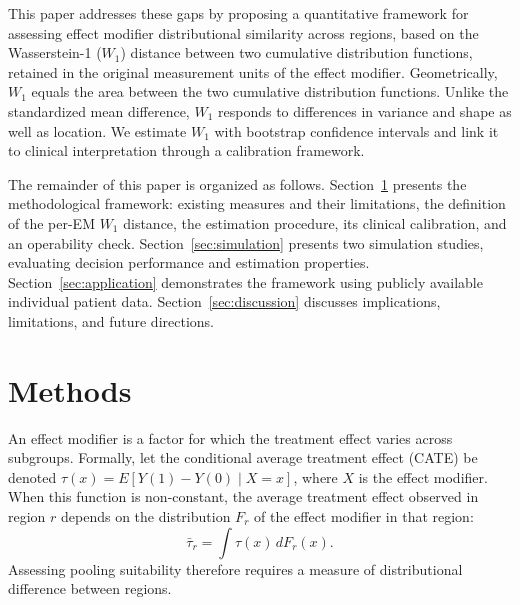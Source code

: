 \documentclass[AMA,Times1COL]{WileyNJDv5}
\begin{document}
This paper addresses these gaps by proposing a quantitative framework for assessing effect modifier distributional similarity across regions, based on the Wasserstein-1 ($W_1$) distance between two cumulative distribution functions, retained in the original measurement units of the effect modifier. Geometrically, $W_1$ equals the area between the two cumulative distribution functions. Unlike the standardized mean difference, $W_1$ responds to differences in variance and shape as well as location. We estimate $W_1$ with bootstrap confidence intervals and link it to clinical interpretation through a calibration framework.

The remainder of this paper is organized as follows. Section~\ref{sec:methods} presents the methodological framework: existing measures and their limitations, the definition of the per-EM $W_1$ distance, the estimation procedure, its clinical calibration, and an operability check. Section~\ref{sec:simulation} presents two simulation studies, evaluating decision performance and estimation properties. Section~\ref{sec:application} demonstrates the framework using publicly available individual patient data. Section~\ref{sec:discussion} discusses implications, limitations, and future directions.

\section{Methods}\label{sec:methods}

An effect modifier is a factor for which the treatment effect varies across subgroups. Formally, let the conditional average treatment effect (CATE) be denoted $\tau(x) = E[Y(1) - Y(0) \mid X = x]$, where $X$ is the effect modifier. When this function is non-constant, the average treatment effect observed in region $r$ depends on the distribution $F_r$ of the effect modifier in that region:
\begin{equation}
\bar{\tau}_r = \int \tau(x) \, dF_r(x).
\label{eq:regional_ate}
\end{equation}
Assessing pooling suitability therefore requires a measure of distributional difference between regions.
\end{document}
